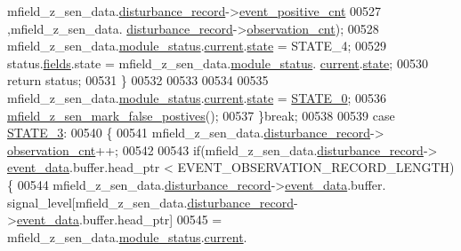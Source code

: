 \begin{DoxyCode}
      mfield\_z\_sen\_data.\hyperlink{a00027_ac9b38e2c1d3f1013a88d33506c754152}{disturbance\_record}->\hyperlink{a00028_a7397b9d76d4b57500f27bb23d258a18a}{event\_positive\_cnt}
00527                                                                                     ,mfield\_z\_sen\_data.
      \hyperlink{a00027_ac9b38e2c1d3f1013a88d33506c754152}{disturbance\_record}->\hyperlink{a00028_ad5b0bac02ce266b91b2b52a1c3ea1d78}{observation\_cnt});
00528                mfield\_z\_sen\_data.\hyperlink{a00027_adfab5a5d8b45a93dfb13edb24e2b80e3}{module\_status}.\hyperlink{a00019_acf41ffc11da291c2f9f0fcb02ee72b98}{current}.\hyperlink{a00019_a6b8d8e916bc56265a3fd279bd26b6d1b}{state} = STATE\_4;
00529                status.\hyperlink{a00021_a5296d090c085b0421fdf5a86e382abea}{fields}.state = mfield\_z\_sen\_data.\hyperlink{a00027_adfab5a5d8b45a93dfb13edb24e2b80e3}{module\_status}.
      \hyperlink{a00019_acf41ffc11da291c2f9f0fcb02ee72b98}{current}.\hyperlink{a00019_a6b8d8e916bc56265a3fd279bd26b6d1b}{state};
00530                \textcolor{keywordflow}{return} status;
00531              \}
00532 
00533 
00534 
00535                mfield\_z\_sen\_data.\hyperlink{a00027_adfab5a5d8b45a93dfb13edb24e2b80e3}{module\_status}.\hyperlink{a00019_acf41ffc11da291c2f9f0fcb02ee72b98}{current}.\hyperlink{a00019_a6b8d8e916bc56265a3fd279bd26b6d1b}{state} = 
      \hyperlink{a00021_ad6739dbbe5581cac99b7dc8a5e09949c}{STATE\_0};
00536                \hyperlink{a00053_acd2adf617d062b1d3dfc9df79aa2ad32}{mfield\_z\_sen\_mark\_false\_postives}();
00537         \}\textcolor{keywordflow}{break};
00538 
00539          \textcolor{keywordflow}{case} \hyperlink{a00021_ad87f1bc8466a25d9f7da68717d324a22}{STATE\_3}: 
00540         \{
00541             mfield\_z\_sen\_data.\hyperlink{a00027_ac9b38e2c1d3f1013a88d33506c754152}{disturbance\_record}->
      \hyperlink{a00028_ad5b0bac02ce266b91b2b52a1c3ea1d78}{observation\_cnt}++;
00542 
00543             \textcolor{keywordflow}{if}(mfield\_z\_sen\_data.\hyperlink{a00027_ac9b38e2c1d3f1013a88d33506c754152}{disturbance\_record}->
      \hyperlink{a00028_a8c0bda69e71ef674e60da47ad0be9ab0}{event\_data}.buffer.head\_ptr < EVENT\_OBSERVATION\_RECORD\_LENGTH)\{
00544             mfield\_z\_sen\_data.\hyperlink{a00027_ac9b38e2c1d3f1013a88d33506c754152}{disturbance\_record}->\hyperlink{a00028_a8c0bda69e71ef674e60da47ad0be9ab0}{event\_data}.buffer.
      signal\_level[mfield\_z\_sen\_data.\hyperlink{a00027_ac9b38e2c1d3f1013a88d33506c754152}{disturbance\_record}->\hyperlink{a00028_a8c0bda69e71ef674e60da47ad0be9ab0}{event\_data}.buffer.head\_ptr]
00545                     = mfield\_z\_sen\_data.\hyperlink{a00027_adfab5a5d8b45a93dfb13edb24e2b80e3}{module\_status}.\hyperlink{a00019_acf41ffc11da291c2f9f0fcb02ee72b98}{current}.

\end{DoxyCode}
